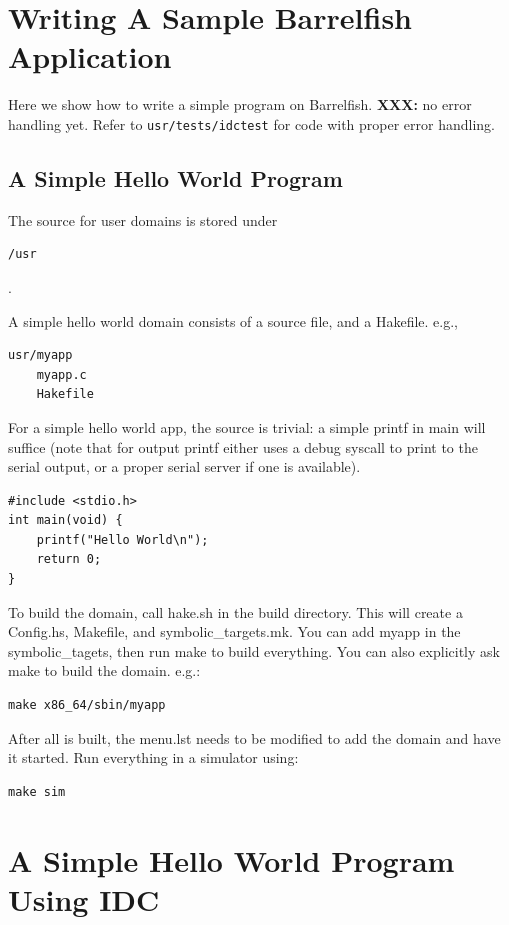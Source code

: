 
\section{Writing A Sample Barrelfish Application}

Here we show how to write a simple program on Barrelfish.  \textbf{XXX:} no
error handling yet.  Refer to \texttt{usr/tests/idctest} for code with proper
error handling.

\subsection{A Simple Hello World Program}

The source for user domains is stored under \begin{verbatim}/usr\end{verbatim}.

A simple hello world domain consists of a source file, and a Hakefile. e.g.,
\begin{verbatim}
usr/myapp
    myapp.c
    Hakefile
\end{verbatim}

For a simple hello world app, the source is trivial: a simple printf in main
will suffice (note that for output printf either uses a debug syscall to print
to the serial output, or a proper serial server if one is available).

\begin{verbatim}
#include <stdio.h>
int main(void) {
    printf("Hello World\n");
    return 0;
}
\end{verbatim}

To build the domain, call hake.sh in the build directory. This will create a
Config.hs, Makefile, and symbolic\_targets.mk. You can add myapp in the
symbolic\_tagets, then run make to build everything. You can also explicitly ask
make to build the domain. e.g.:
\begin{verbatim}
make x86_64/sbin/myapp
\end{verbatim}

After all is built, the menu.lst needs to be modified to add the domain and have
it started. Run everything in a simulator using:

\begin{verbatim}
make sim
\end{verbatim}

\section{A Simple Hello World Program Using IDC}

